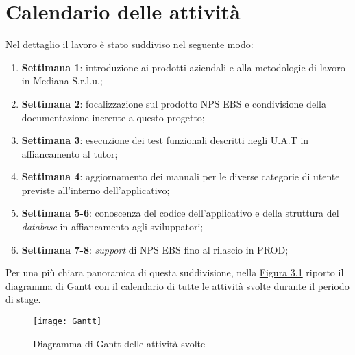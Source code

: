 \section{Calendario delle attività}
\label{calendario}
Nel dettaglio il lavoro è stato suddiviso nel seguente modo:
\begin{enumerate}
\item \textbf{Settimana 1}: introduzione ai prodotti aziendali e alla metodologie di lavoro in Mediana S.r.l.u.;
\item \textbf{Settimana 2}: focalizzazione sul prodotto NPS EBS e condivisione della documentazione inerente a questo progetto;
\item \textbf{Settimana 3}: esecuzione dei test funzionali descritti negli U.A.T in affiancamento al tutor;
\item \textbf{Settimana 4}: aggiornamento dei manuali per le diverse categorie di utente previste all'interno dell'applicativo;
\item \textbf{Settimana 5-6}: conoscenza del codice dell'applicativo e della struttura del \textit{database} in affiancamento agli sviluppatori;
\item \textbf{Settimana 7-8}: \textit{support} di NPS EBS fino al rilascio in PROD\footnotemark[2] 
;
\end{enumerate}

Per una più chiara panoramica di questa suddivisione, nella \hyperref[gantt attivita]{Figura 3.1} riporto il \gls{diagramma di Gantt} con il calendario di tutte le attività svolte durante il periodo di stage.

\begin{figure}[h!]
\begin{center}
\texttt{[image: Gantt]} 
\caption{Diagramma di Gantt delle attività svolte}
\label{gantt attivita}
\end{center}
\end{figure}
\FloatBarrier

